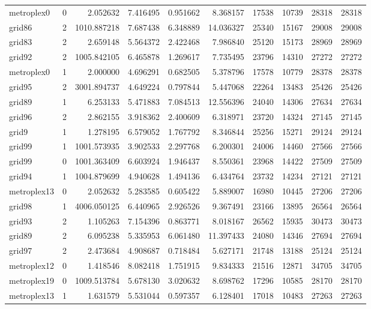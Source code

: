 \begin{longtable}{|l|r|r|r|r|r|r|r|r|r|}
metroplex0 & 0 & 2.052632 & 7.416495 & 0.951662 & 8.368157 & 17538 & 10739 & 28318 & 28318 \\
grid86 & 2 & 1010.887218 & 7.687438 & 6.348889 & 14.036327 & 25340 & 15167 & 29008 & 29008 \\
grid83 & 2 & 2.659148 & 5.564372 & 2.422468 & 7.986840 & 25120 & 15173 & 28969 & 28969 \\
grid92 & 2 & 1005.842105 & 6.465878 & 1.269617 & 7.735495 & 23796 & 14310 & 27272 & 27272 \\
metroplex0 & 1 & 2.000000 & 4.696291 & 0.682505 & 5.378796 & 17578 & 10779 & 28378 & 28378 \\
grid95 & 2 & 3001.894737 & 4.649224 & 0.797844 & 5.447068 & 22264 & 13483 & 25426 & 25426 \\
grid89 & 1 & 6.253133 & 5.471883 & 7.084513 & 12.556396 & 24040 & 14306 & 27634 & 27634 \\
grid96 & 2 & 2.862155 & 3.918362 & 2.400609 & 6.318971 & 23720 & 14324 & 27145 & 27145 \\
grid9 & 1 & 1.278195 & 6.579052 & 1.767792 & 8.346844 & 25256 & 15271 & 29124 & 29124 \\
grid99 & 1 & 1001.573935 & 3.902533 & 2.297768 & 6.200301 & 24006 & 14460 & 27566 & 27566 \\
grid99 & 0 & 1001.363409 & 6.603924 & 1.946437 & 8.550361 & 23968 & 14422 & 27509 & 27509 \\
grid94 & 1 & 1004.879699 & 4.940628 & 1.494136 & 6.434764 & 23732 & 14234 & 27121 & 27121 \\
metroplex13 & 0 & 2.052632 & 5.283585 & 0.605422 & 5.889007 & 16980 & 10445 & 27206 & 27206 \\
grid98 & 1 & 4006.050125 & 6.440965 & 2.926526 & 9.367491 & 23166 & 13895 & 26564 & 26564 \\
grid93 & 2 & 1.105263 & 7.154396 & 0.863771 & 8.018167 & 26562 & 15935 & 30473 & 30473 \\
grid89 & 2 & 6.095238 & 5.335953 & 6.061480 & 11.397433 & 24080 & 14346 & 27694 & 27694 \\
grid97 & 2 & 2.473684 & 4.908687 & 0.718484 & 5.627171 & 21748 & 13188 & 25124 & 25124 \\
metroplex12 & 0 & 1.418546 & 8.082418 & 1.751915 & 9.834333 & 21516 & 12871 & 34705 & 34705 \\
metroplex19 & 0 & 1009.513784 & 5.678130 & 3.020632 & 8.698762 & 17296 & 10585 & 28170 & 28170 \\
metroplex13 & 1 & 1.631579 & 5.531044 & 0.597357 & 6.128401 & 17018 & 10483 & 27263 & 27263 \\

\end{longtable}
